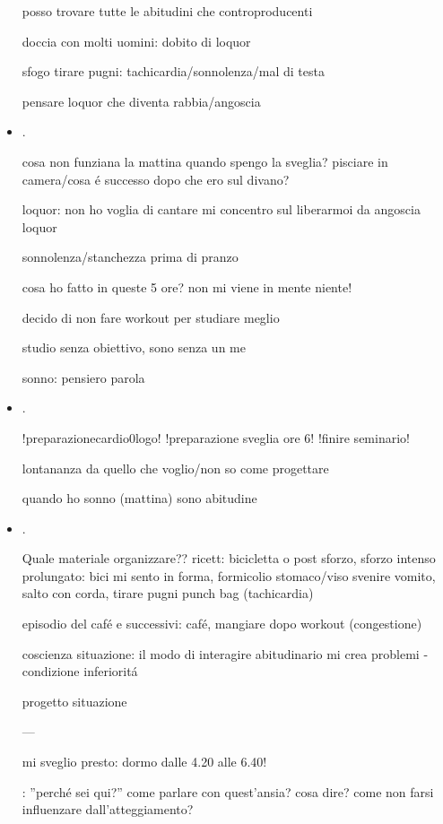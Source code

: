 \begin{itemize}
posso trovare tutte le abitudini che controproducenti

doccia con molti uomini: dobito di loquor

sfogo tirare pugni: tachicardia/sonnolenza/mal di testa

pensare loquor che diventa rabbia/angoscia

\item {}.

cosa non funziana la mattina quando spengo la sveglia? pisciare in camera/cosa \'e successo dopo che ero sul divano?

loquor: non ho voglia di cantare mi concentro sul liberarmoi da angoscia loquor

sonnolenza/stanchezza prima di pranzo

cosa ho fatto in queste 5 ore? non mi viene in mente niente!

decido di non fare workout per studiare meglio

studio senza obiettivo, sono senza un me

sonno: pensiero parola

\item {}.

!preparazionecardio0logo!
!preparazione sveglia ore 6!
!finire seminario!

lontananza da quello che voglio/non so come progettare

quando ho sonno (mattina) sono abitudine


\item {}.

Quale materiale organizzare?? ricett: bicicletta o post sforzo, sforzo intenso prolungato: bici mi sento in forma, formicolio stomaco/viso svenire vomito, salto con corda, tirare pugni punch bag (tachicardia)

episodio del caf\'e e successivi: caf\'e, mangiare dopo workout (congestione)

coscienza situazione: il modo di interagire abitudinario mi crea problemi - condizione inferiorit\'a 

progetto situazione

---

mi sveglio presto: dormo dalle 4.20 alle 6.40!

: ''perch\'e sei qui?'' come parlare con quest'ansia? cosa dire? come non farsi influenzare dall'atteggiamento?


\end{itemize}
